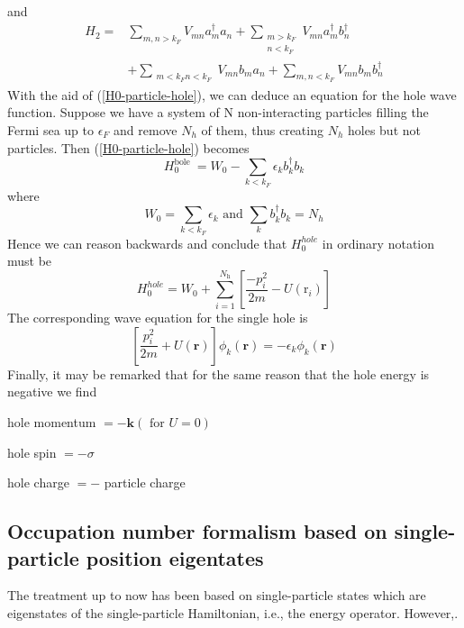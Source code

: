 and
\begin{equation}\begin{aligned}
H_{2}=& \sum_{m, n>k_F} V_{m n} a_{m}^{\dagger} a_{n}+\sum_{\substack{m > k_F\\n<k_F}} V_{m n} a_{m}^{\dagger} b_{n}^{\dagger} \\
&+\sum_{\substack{m<k_{F} n<k_F}} V_{m n} b_{m} a_{n}+\sum_{m, n<k_{F}} V_{m n} b_{m} b_{n}^{\dagger}
\end{aligned}
\label{H2-particle-hole}
\end{equation}
With the aid of (\ref{H0-particle-hole}), we can deduce an equation for the hole wave function. Suppose we have a system of N non-interacting particles filling the Fermi sea up to $\epsilon_F$ and remove $N_h$ of them, thus creating $N_h$ holes but not particles. Then (\ref{H0-particle-hole}) becomes
$$H_{0}^{\text {bole }}=W_{0}-\sum_{k<k_{F}} \epsilon_{k} b_{k}^{\dagger} b_{k}$$
where
$$W_{0}=\sum_{k<k_{F} } \epsilon_{k} \text { and } \sum_{k} b_{k}^{\dagger} b_{k}=N_{h}$$
Hence we can reason backwards and conclude that $H_0^{hole}$ in ordinary notation must be
\begin{equation}H_{0}^{hole}=W_{\mathrm{0}}+\sum_{i=1}^{N_{\mathrm{h}}}\left[\frac{-p_{i}^{2}}{2 m}-U\left(\mathrm{r}_{i}\right)\right]\end{equation}
The corresponding wave equation for the single hole is
\begin{equation}\left[\frac{p_{i}^{2}}{2 m}+U(\mathbf{r})\right] \phi_{k}(\mathbf{r})=-\epsilon_{k} \phi_{k}(\mathbf{r})\end{equation}
Finally, it may be remarked that for the same reason that the hole energy is
negative we find
\begin{imp}
hole momentum $=-\mathbf{k}(\text { for } U=0)$

hole spin $=-\sigma$

hole charge $=-$ particle charge
\end{imp}

\subsection{Occupation number formalism based on single-particle position eigentates}
The treatment up to now has been based on single-particle states which are eigenstates of the single-particle Hamiltonian, i.e., the energy operator. However,.


